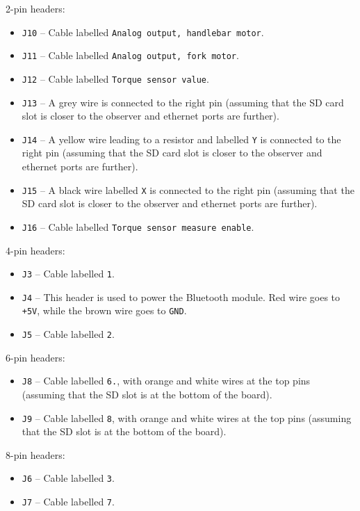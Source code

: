 2-pin headers:
\begin{itemize}[noitemsep]
  \item \verb|J10| -- Cable labelled \verb|Analog output, handlebar motor|.
  \item \verb|J11| -- Cable labelled \verb|Analog output, fork motor|.
  \item \verb|J12| -- Cable labelled \verb|Torque sensor value|.
  \item \verb|J13| -- A grey wire is connected to the right pin (assuming that the SD card slot is closer to the observer and ethernet ports are further).
  \item \verb|J14| -- A yellow wire leading to a resistor and labelled \verb|Y| is connected to the right pin (assuming that the SD card slot is closer to the observer and ethernet ports are further).
  \item \verb|J15| -- A black wire labelled \verb|X| is connected to the right pin (assuming that the SD card slot is closer to the observer and ethernet ports are further).
  \item \verb|J16| -- Cable labelled \verb|Torque sensor measure enable|.
\end{itemize}

4-pin headers:
\begin{itemize}[noitemsep]
  \item \verb|J3| -- Cable labelled \verb|1|.
  \item \verb|J4| -- This header is used to power the Bluetooth module. Red wire goes to \verb|+5V|, while the brown wire goes to \verb|GND|.
  \item \verb|J5| -- Cable labelled \verb|2|.
\end{itemize}

6-pin headers:
\begin{itemize}[noitemsep]
  \item \verb|J8| -- Cable labelled \verb|6.|, with orange and white wires at the top pins (assuming that the SD slot is at the bottom of the board).
  \item \verb|J9| -- Cable labelled \verb|8|, with orange and white wires at the top pins (assuming that the SD slot is at the bottom of the board).
\end{itemize}

8-pin headers:
\begin{itemize}[noitemsep]
  \item \verb|J6| -- Cable labelled \verb|3|.
  \item \verb|J7| -- Cable labelled \verb|7|.
\end{itemize}

